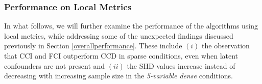 \documentclass[twoside, 11pt]{article}
\newcommand*{\figref}[2][]{%
  \hyperref[{fig:#2}]{%
    Figure~\ref*{fig:#2}%
    \ifx\\#1\\%
    \else
      #1%
    \fi
  }%
}
\begin{document}






\subsubsection{Performance on Local Metrics} \label{performance-detail}
In what follows, we will further examine the performance of the algorithms using local metrics, while addressing some of the unexpected findings discussed previously in Section \ref{overallperformance}. These include $(i)$ the observation that CCI and FCI outperform CCD in sparse conditions, even when latent confounders are not present and $(ii)$ the SHD values increase instead of decreasing with increasing sample size in the \textit{5-variable dense} conditions.
\end{document}
